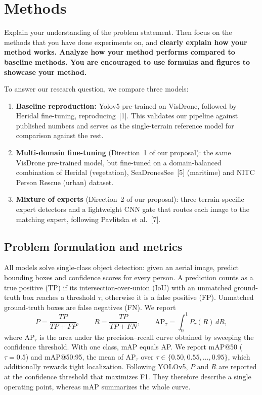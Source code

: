 \documentclass{article}
\begin{document}
\section{Methods}
Explain your understanding of the problem statement. Then focus on the methods that you have done experiments on, and \textbf{clearly explain how your method works. Analyze how your method performs compared to baseline methods. You are encouraged to use formulas and figures to showcase your method.}

To answer our research question, we compare three models:
\begin{enumerate}
    \item[(a)] \textbf{Baseline reproduction:} Yolov5 pre-trained on VisDrone, followed by Heridal fine-tuning, reproducing~[1]. This validates our pipeline against published numbers and serves as the single-terrain reference model for comparison against the rest.
    \item[(b)] \textbf{Multi-domain fine-tuning} (Direction~1 of our proposal): the same VisDrone pre-trained model, but fine-tuned on a domain-balanced combination of Heridal (vegetation), SeaDronesSee~[5] (maritime) and NITC Person Rescue  (urban) dataset.
    \item[(c)] \textbf{Mixture of experts} (Direction~2 of our proposal): three terrain-specific expert detectors and a lightweight CNN gate that routes each image to the matching expert, following Pavlitska et al.~[7].
\end{enumerate}

\subsection{Problem formulation and metrics}
All models solve single-class object detection: given an aerial image, predict bounding boxes and confidence scores for every person. A prediction counts as a true positive (TP) if its intersection-over-union (IoU) with an unmatched ground-truth box reaches a threshold $\tau$, otherwise it is a false positive (FP). Unmatched ground-truth boxes are false negatives (FN). We report
\begin{equation}
    P = \frac{TP}{TP+FP}, \qquad R = \frac{TP}{TP+FN}, \qquad
    \mathrm{AP}_\tau = \int_0^1 P_\tau(R)\,dR,
\end{equation}
where $\mathrm{AP}_\tau$ is the area under the precision--recall curve obtained by sweeping the confidence threshold. With one class, mAP equals AP. We report mAP@50 ($\tau=0.5$) and mAP@50:95, the mean of $\mathrm{AP}_\tau$ over $\tau \in \{0.50, 0.55, \dots, 0.95\}$, which additionally rewards tight localization. Following YOLOv5, $P$ and $R$ are reported at the confidence threshold that maximizes F1. They therefore describe a single operating point, whereas mAP summarizes the whole curve.
 
\end{document}
